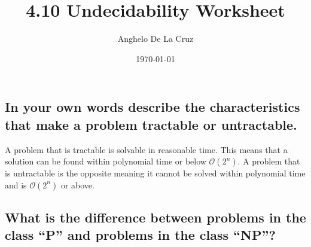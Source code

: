 \documentclass{article}
\title{4.10 Undecidability Worksheet}
\author{Anghelo De La Cruz}
\date{\today}
\begin{document}
\subsection*{In your own words describe the characteristics that make
  a problem tractable or untractable.  }

A problem that is tractable is solvable in reasonable time. This means
that a solution can be found within polynomial time or below
$\mathcal{O}(2^n)$. A problem that is untractable is the opposite
meaning it cannot be solved within polynomial time and is
$\mathcal{O}(2^n)$ or above.

\subsection*{What is the difference between problems in the class “P”
  and problems in the class “NP”?}
\end{document}
